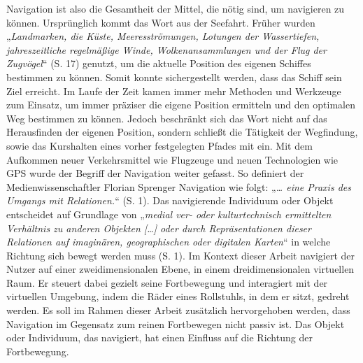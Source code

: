 Navigation ist also die Gesamtheit der Mittel, die nötig sind, um navigieren zu können.
Ursprünglich kommt das Wort aus der Seefahrt.
Früher wurden „\textit{Landmarken, die Küste, Meeresströmungen, Lotungen der Wassertiefen, jahreszeitliche regelmäßige Winde, Wolkenansammlungen und der Flug der Zugvögel}“ (S. 17)\cite{wolfschmidtNavigareNecesseEst2008} genutzt, um die aktuelle Position des eigenen Schiffes bestimmen zu können.
Somit konnte sichergestellt werden, dass das Schiff sein Ziel erreicht.
Im Laufe der Zeit kamen immer mehr Methoden und Werkzeuge zum Einsatz, um immer präziser die eigene Position ermitteln und den optimalen Weg bestimmen zu können.
Jedoch beschränkt sich das Wort nicht auf das Herausfinden der eigenen Position, sondern schließt die Tätigkeit der Wegfindung, sowie das Kurshalten eines vorher festgelegten Pfades mit ein.
Mit dem Aufkommen neuer Verkehrsmittel wie Flugzeuge und neuen Technologien wie GPS wurde der Begriff der Navigation weiter gefasst.
So definiert der Medienwissenschaftler Florian Sprenger Navigation wie folgt: „\textit{… eine Praxis des Umgangs mit Relationen.}“ (S. 1)\cite{sprengerNavigationenUndRelationen2022}.
Das navigierende Individuum oder Objekt entscheidet auf Grundlage von „\textit{medial ver- oder kulturtechnisch ermittelten Verhältnis zu anderen Objekten […] oder durch Repräsentationen dieser Relationen auf imaginären, geographischen oder digitalen Karten}“ in welche Richtung sich bewegt werden muss (S. 1)\cite{sprengerNavigationenUndRelationen2022}.
Im Kontext dieser Arbeit navigiert der Nutzer auf einer zweidimensionalen Ebene, in einem dreidimensionalen virtuellen Raum.
Er steuert dabei gezielt seine Fortbewegung und interagiert mit der virtuellen Umgebung, indem die Räder eines Rollstuhls, in dem er sitzt, gedreht werden.
Es soll im Rahmen dieser Arbeit zusätzlich hervorgehoben werden, dass Navigation im Gegensatz zum reinen Fortbewegen nicht passiv ist.
Das Objekt oder Individuum, das navigiert, hat einen Einfluss auf die Richtung der Fortbewegung.

